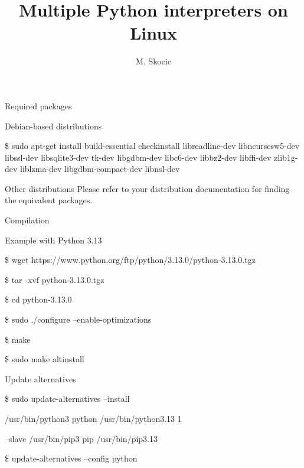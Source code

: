\documentclass[10pt,compress]{beamer}
\title{Multiple Python interpreters on Linux}
\author{M. Skocic}
\begin{document}
\begin{frame}
    \titlepage
\end{frame}

\begin{frame}{Required packages}
    
    \begin{alertblock}{Debian-based distributions}

        \begin{semiverbatim}
        {\small
        \$ sudo apt-get install build-essential checkinstall
        libreadline-dev libncursesw5-dev libssl-dev 
        libsqlite3-dev tk-dev libgdbm-dev libc6-dev libbz2-dev libffi-dev
        zlib1g-dev liblzma-dev libgdbm-compact-dev libnsl-dev}
        \end{semiverbatim}
    
    \end{alertblock}

    \begin{alertblock}{Other distributions}
    Please refer to your distribution documentation for finding the 
    equivalent packages.
    \end{alertblock}

\end{frame}


\begin{frame}{Compilation}

    \alert{Example with Python 3.13}
    
        \begin{semiverbatim}
        {\small

        \$ wget https://www.python.org/ftp/python/3.13.0/python-3.13.0.tgz
        
        \$ tar -xvf python-3.13.0.tgz
        
        \$ cd python-3.13.0

        \$ sudo ./configure --enable-optimizations

        \$ make

        \$ sudo make altinstall
        }
        \end{semiverbatim}

\end{frame}

\begin{frame}{Update alternatives}

        \begin{semiverbatim}
        {\small

        \$ sudo update-alternatives --install \ 

        /usr/bin/python3 python /usr/bin/python3.13 1 \
        
        --slave /usr/bin/pip3 pip /usr/bin/pip3.13

        \$ update-alternatives --config python
        }
        \end{semiverbatim}

\end{frame}
\end{document}
